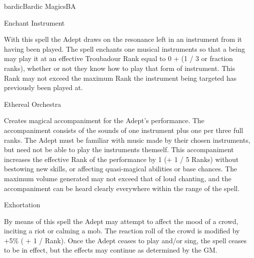 \begin{college}[2.1]{bardic}{Bardic Magics}{BA}
\begin{spell}[G-2]{Enchant Instrument}


\begin{effects}
With this spell the Adept draws on the resonance left in an instrument
from it having been played. The spell enchants one musical instruments
so that a being may play it at an effective Troubadour Rank equal to 0
+ (1 / 3 or fraction ranks), whether or not they know how to play that
form of instrument. This Rank may not exceed the maximum Rank the
instrument being targeted has previously been played at.
\end{effects}
\end{spell}

\begin{spell}[G-3]{Ethereal Orchestra}

\begin{effects}
Creates magical accompaniment for the Adept's performance. The
accompaniment consists of the sounds of one instrument plus one per
three full ranks. The Adept must be familiar with music made by their
chosen instruments, but need not be able to play the instruments
themself. This accompaniment increases the effective Rank of the
performance by 1 (+ 1 / 5 Ranks) without bestowing new skills, or
affecting quasi-magical abilities or base chances. The maximum volume
generated may not exceed that of loud chanting, and the accompaniment
can be heard clearly everywhere within the range of the spell.
\end{effects}
\end{spell}

\begin{spell}[G-4]{Exhortation}

\begin{effects}
By means of this spell the Adept may attempt to affect the mood of a
crowd, inciting a riot or calming a mob. The reaction roll of the
crowd is modified by +5\% ( + 1 / Rank). Once the Adept ceases to play
and/or sing, the spell ceases to be in effect, but the effects may
continue as determined by the GM.
\end{effects}
\end{spell}


\end{college}
